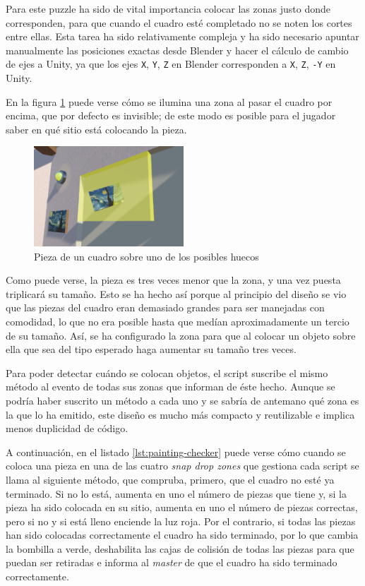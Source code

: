 Para este puzzle ha sido de vital importancia colocar las zonas justo donde corresponden, para que cuando el cuadro esté completado no se noten los cortes entre ellas. Esta tarea ha sido relativamente compleja y ha sido necesario apuntar manualmente las posiciones exactas desde Blender y hacer el cálculo de cambio de ejes a Unity, ya que los ejes \texttt{X}, \texttt{Y}, \texttt{Z} en Blender corresponden a \texttt{X}, \texttt{Z}, \texttt{-Y} en Unity.

En la figura \ref{fig:painting-piece-hover} puede verse cómo se ilumina una zona al pasar el cuadro por encima, que por defecto es invisible; de este modo es posible para el jugador saber en qué sitio está colocando la pieza.

\begin{figure}[!h]
\begin{center}
\includegraphics[width=0.5\textwidth]{imagenes/7/painting-piece-hover.png}
\caption{Pieza de un cuadro sobre uno de los posibles huecos}
\label{fig:painting-piece-hover}
\end{center}
\vspace{-0.5cm}
\end{figure}

Como puede verse, la pieza es tres veces menor que la zona, y una vez puesta triplicará su tamaño. Esto se ha hecho así porque al principio del diseño se vio que las piezas del cuadro eran demasiado grandes para ser manejadas con comodidad, lo que no era posible hasta que medían aproximadamente un tercio de su tamaño. Así, se ha configurado la zona para que al colocar un objeto sobre ella que sea del tipo esperado haga aumentar su tamaño tres veces.

Para poder detectar cuándo se colocan objetos, el script suscribe el mismo método al evento de todas sus zonas que informan de éste hecho. Aunque se podría haber suscrito un método a cada uno y se sabría de antemano qué zona es la que lo ha emitido, este diseño es mucho más compacto y reutilizable e implica menos duplicidad de código.

A continuación, en el listado \ref{lst:painting-checker} puede verse cómo cuando se coloca una pieza en una de las cuatro \textit{snap drop zones} que gestiona cada script se llama al siguiente método, que compruba, primero, que el cuadro no esté ya terminado. Si no lo está, aumenta en uno el número de piezas que tiene y, si la pieza ha sido colocada en su sitio, aumenta en uno el número de piezas correctas, pero si no y si está lleno enciende la luz roja. Por el contrario, si todas las piezas han sido colocadas correctamente el cuadro ha sido terminado, por lo que cambia la bombilla a verde, deshabilita las cajas de colisión de todas las piezas para que puedan ser retiradas e informa al \textit{master} de que el cuadro ha sido terminado correctamente.

